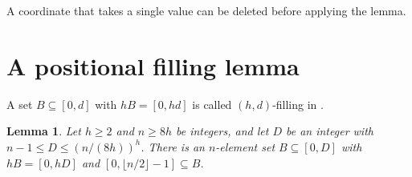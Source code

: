\documentclass[11pt]{amsart}
\newtheorem{lemma}[theorem]{Lemma}
\theoremstyle{definition}
\theoremstyle{remark}
\numberwithin{equation}{section}
\begin{document}
A coordinate that takes a single value can be deleted before applying the lemma.

\section{A positional filling lemma}\label{sec:digit}

A set $B\subseteq[0,d]$ with $hB=[0,hd]$ is called $(h,d)$-filling in \cite[Definition~4.3]{Raj26}.

\begin{lemma}\label{lem:digit}
Let $h\ge 2$ and $n\ge 8h$ be integers, and let $D$ be an integer with $n-1\le D\le(n/(8h))^h$. There is an $n$-element set $B\subseteq[0,D]$ with $hB=[0,hD]$ and $[0,\lfloor n/2\rfloor-1]\subseteq B$.
\end{lemma}
\end{document}
